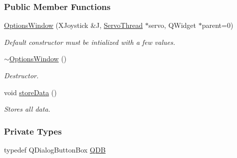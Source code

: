\subsubsection*{Public Member Functions}
\begin{DoxyCompactItemize}
\item 
\hyperlink{a00006_ae8e0a610d13a0478bdac57ec7cd4afba}{Options\+Window} (X\+Joystick \&J, \hyperlink{a00009}{Servo\+Thread} $\ast$servo, Q\+Widget $\ast$parent=0)
\begin{DoxyCompactList}\small\item\em Default constructor must be intialized with a few values. \end{DoxyCompactList}\item 
\hyperlink{a00006_a034c885fe8bb4416e732a9571d14a6b4}{$\sim$\+Options\+Window} ()
\begin{DoxyCompactList}\small\item\em Destructor. \end{DoxyCompactList}\item 
void \hyperlink{a00006_ab0a56ad7347c20046602a7a2a1c83397}{store\+Data} ()
\begin{DoxyCompactList}\small\item\em Stores all data. \end{DoxyCompactList}\end{DoxyCompactItemize}
\subsubsection*{Private Types}
\begin{DoxyCompactItemize}
\item 
typedef Q\+Dialog\+Button\+Box \hyperlink{a00006_aadac35a91eb1992c12e4ba6c4d5ad1be}{Q\+D\+B}
\end{DoxyCompactItemize}
